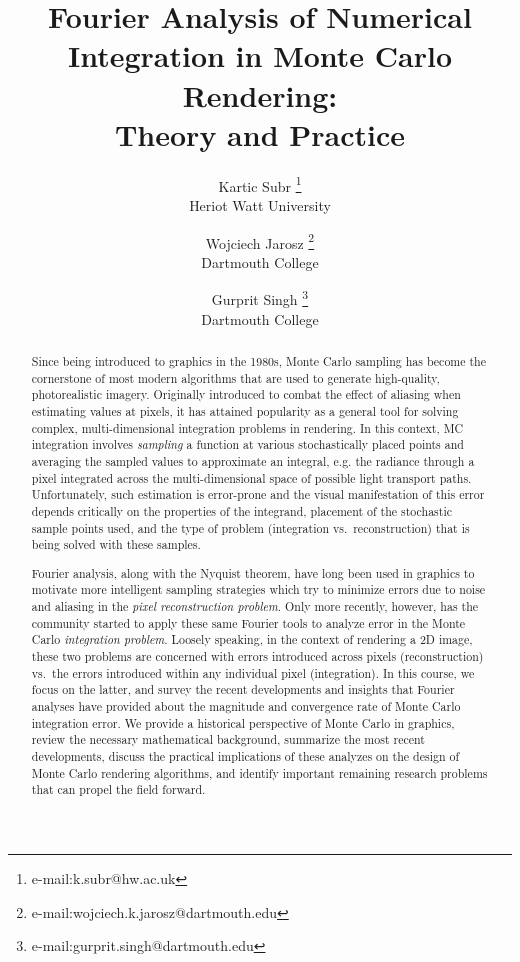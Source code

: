 \documentclass{acmsiggraph}
\title{Fourier Analysis of Numerical Integration in Monte Carlo Rendering:  \\Theory and Practice}
\author{
Kartic Subr  \thanks{e-mail:k.subr@hw.ac.uk}\\Heriot Watt University 
\and Wojciech Jarosz  \thanks{e-mail:wojciech.k.jarosz@dartmouth.edu}\\Dartmouth College
\and Gurprit Singh  \thanks{e-mail:gurprit.singh@dartmouth.edu}\\Dartmouth College
}
\begin{document}


\maketitle

\begin{abstract}

Since being introduced to graphics in the 1980s, Monte Carlo sampling has become the cornerstone of most modern algorithms that are used to generate high-quality, photorealistic imagery. Originally introduced to combat the effect of aliasing when estimating values at pixels, it has attained popularity as a general tool for solving complex, multi-dimensional integration problems in rendering. In this context, MC integration involves \textit{sampling} a function at various stochastically placed points and averaging the sampled values to approximate an integral, e.g. the radiance through a pixel integrated across the multi-dimensional space of possible light transport paths. Unfortunately, such estimation is error-prone and the visual manifestation of this error depends critically on the properties of the integrand, placement of the stochastic sample points used, and the type of problem (integration vs.\ reconstruction) that is being solved with these samples.

Fourier analysis, along with the Nyquist theorem, have long been used in graphics to motivate more intelligent sampling strategies which try to minimize errors due to noise and aliasing in the \textit{pixel reconstruction problem}. Only more recently, however, has the community started to apply these same Fourier tools to analyze error in the Monte Carlo \textit{integration problem}. Loosely speaking, in the context of rendering a 2D image, these two problems are concerned with errors introduced across pixels (reconstruction) vs.\ the errors introduced within any individual pixel (integration). In this course, we focus on the latter, and survey the recent developments and insights that Fourier analyses have provided about the magnitude and convergence rate of Monte Carlo integration error. We provide a historical perspective of Monte Carlo in graphics, review the necessary mathematical background, summarize the most recent developments, discuss the practical implications of these analyzes on the design of Monte Carlo rendering algorithms, and identify important remaining research problems that can propel the field forward.

\end{abstract}
\end{document}
